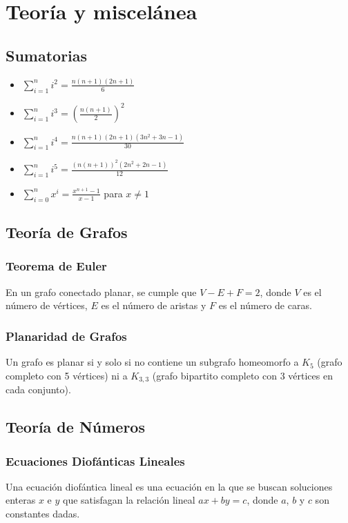 \section{Teoría y miscelánea}

\subsection{Sumatorias}
\begin{multicols}{2}
\begin{itemize}
    \item $\sum_{i=1}^{n} i^2 = \frac{n(n+1)(2n+1)}{6}$
    \item $\sum_{i=1}^{n} i^3 = \left(\frac{n(n+1)}{2}\right)^2$
    \item $\sum_{i=1}^{n} i^4 = \frac{n(n+1)(2n+1)(3n^2+3n-1)}{30}$
    \item $\sum_{i=1}^{n} i^5 = \frac{(n(n+1))^2(2n^2+2n-1)}{12}$
    \item $\sum_{i=0}^{n} x^i = \frac{x^{n+1}-1}{x-1}$ para $x \neq 1$
\end{itemize}
\end{multicols}

\subsection{Teoría de Grafos}
\subsubsection{Teorema de Euler}
En un grafo conectado planar, se cumple que $V - E + F = 2$, donde $V$ es el número de vértices, $E$ es el número de aristas y $F$ es el número de caras.

\subsubsection{Planaridad de Grafos}
Un grafo es planar si y solo si no contiene un subgrafo homeomorfo a $K_5$ (grafo completo con 5 vértices) ni a $K_{3,3}$ (grafo bipartito completo con 3 vértices en cada conjunto).

\subsection{Teoría de Números}
\subsubsection{Ecuaciones Diofánticas Lineales}
Una ecuación diofántica lineal es una ecuación en la que se buscan soluciones enteras $x$ e $y$ que satisfagan la relación lineal $ax + by = c$, donde $a$, $b$ y $c$ son constantes dadas.


